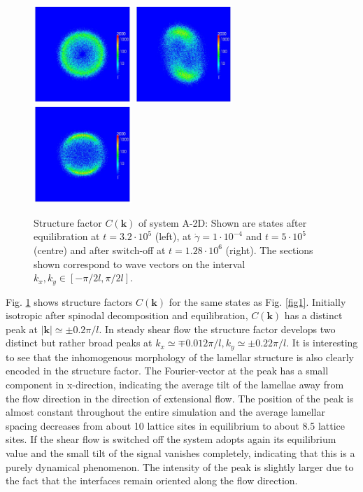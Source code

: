 \documentclass[8.5pt,twoside,twocolumn]{article}
\newcommand{\e}[1]{\cdot10^{#1}}
\begin{document}
\begin{figure}[htp]
\centering
\includegraphics[angle=0,width=0.33\textwidth]{ck_run703_320.jpg}
\includegraphics[angle=0,width=0.33\textwidth]{ck_run704_500.jpg}
\includegraphics[angle=0,width=0.33\textwidth]{ck_run705_1280.jpg}
\caption{Structure factor $C({\bm k})$ of system A-2D: Shown are states after equilibration at $t=3.2\e{5}$ (left), at $\dot{\gamma}=1\cdot10^{-4}$ and $t=5\e{5}$ (centre) and after switch-off at $t=1.28\e{6}$ (right). The sections shown correspond to wave vectors on the interval $k_x, k_y \in [-\pi/2 l,\pi/2 l]$.}
\label{fig5}
\end{figure}

Fig. \ref{fig5} shows structure factors $C({\bm k})$ for the same states as Fig. \ref{fig1}.
Initially isotropic after spinodal decomposition and equilibration, $C({\bm k})$ has a distinct peak at $|{\bm k}|\simeq \pm0.2\pi/l$.
In steady shear flow the structure factor develops two distinct but rather broad peaks at $k_x\simeq\mp 0.012\pi/l, k_y\simeq\pm 0.22 \pi/l$.
It is interesting to see that the inhomogenous morphology of the lamellar structure is also clearly encoded in the structure factor. 
The Fourier-vector at the peak has a small component in x-direction, indicating the average tilt of the lamellae away from the flow direction in the direction of extensional flow.
The position of the peak is almost constant throughout the entire simulation and the average lamellar spacing decreases from about 10 lattice sites in equilibrium to about 8.5 lattice sites.
If the shear flow is switched off the system adopts again its equilibrium value and the small tilt of the signal vanishes completely, indicating that this is a purely dynamical phenomenon. 
The intensity of the peak is slightly larger due to the fact that the interfaces remain oriented along the flow direction.\\
\end{document}
